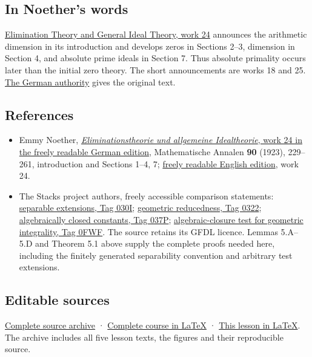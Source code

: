 \documentclass[
]{article}
\providecommand{\tightlist}{%
  \setlength{\itemsep}{0pt}\setlength{\parskip}{0pt}}
\begin{document}
\subsection{In Noether's words}\label{in-noethers-words}

\href{https://zenodo.org/records/21923146/files/00_EMMY_NOETHER_EN_COMPLETE_LINKED_READER.pdf}{Elimination
Theory and General Ideal Theory, work 24} announces the arithmetic
dimension in its introduction and develops zeros in Sections 2--3,
dimension in Section 4, and absolute prime ideals in Section 7. Thus
absolute primality occurs later than the initial zero theory. The short
announcements are works 18 and 25.
\href{https://zenodo.org/records/21908301/files/10-de.pdf}{The German
authority} gives the original text.

\subsection{References}\label{references}

\begin{itemize}
\tightlist
\item
  Emmy Noether,
  \href{https://zenodo.org/records/21908301/files/10-de.pdf}{\emph{Eliminationstheorie
  und allgemeine Idealtheorie}, work 24 in the freely readable German
  edition}, Mathematische Annalen \textbf{90} (1923), 229--261,
  introduction and Sections 1--4, 7;
  \href{https://zenodo.org/records/21923146/files/00_EMMY_NOETHER_EN_COMPLETE_LINKED_READER.pdf}{freely
  readable English edition}, work 24.
\item
  The Stacks project authors, freely accessible comparison statements:
  \href{https://stacks.math.columbia.edu/tag/030I}{separable extensions,
  Tag 030I}; \href{https://stacks.math.columbia.edu/tag/0322}{geometric
  reducedness, Tag 0322};
  \href{https://stacks.math.columbia.edu/tag/037P}{algebraically closed
  constants, Tag 037P};
  \href{https://stacks.math.columbia.edu/tag/0FWF}{algebraic-closure
  test for geometric integrality, Tag 0FWF}. The source retains its GFDL
  licence. Lemmas 5.A--5.D and Theorem 5.1 above supply the complete
  proofs needed here, including the finitely generated separability
  convention and arbitrary test extensions.
\end{itemize}

\subsection{Editable sources}\label{editable-sources}

\href{ideal-theory-in-rings-source.zip}{Complete source archive} ·
\href{ideal-theory-in-rings.tex}{Complete course in LaTeX} ·
\href{NOE-IDL-04.tex}{This lesson in LaTeX}. The archive includes all
five lesson texts, the figures and their reproducible source.
\end{document}
